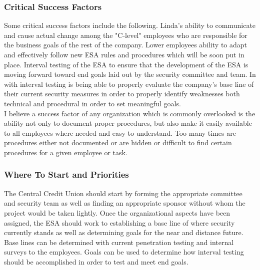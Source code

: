\documentclass[paper=a4, fontsize=11pt]{scrartcl} %
\numberwithin{equation}{section} %
\numberwithin{figure}{section} %
\numberwithin{table}{section} %
\begin{document}

\subsubsection{Critical Success Factors}
Some critical success factors include the following. Linda's ability to
communicate and cause actual change among the "C-level" employees who are
responsible for the business goals of the rest of the company. Lower employees
ability to adapt and effectively follow new ESA rules and procedures which
will be soon put in place. Interval testing of the ESA to ensure that the
development of the ESA is moving forward toward end goals laid out by the
security committee and team. In with interval testing is being able to
properly evaluate the company's base line of their current security measures
in order to properly identify weaknesses both technical and procedural in order
to set meaningful goals.\\

I believe a success factor of any organization which is commonly overlooked
is the ability not only to document proper procedures, but also make it easily
available to all employees where needed and easy to understand. Too many times
are procedures either not documented or are hidden or difficult to find 
certain procedures for a given employee or task.



\subsubsection{Where To Start and Priorities}
The Central Credit Union should start by forming the appropriate committee and
security team as well as finding an appropriate sponsor without whom the project
would be taken lightly. Once the organizational aspects have been assigned, the
ESA should work to establishing a base line of where security currently stands
as well as determining goals for the near and distance future. Base lines can
be determined with current penetration testing and internal surveys to the
employees. Goals can be used to determine how interval testing should be 
accomplished in order to test and meet end goals.
\end{document}
